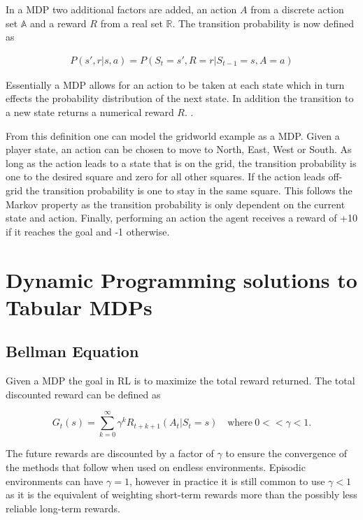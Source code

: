 In a MDP two additional factors are added, an action $A$ from a discrete action set $\mathbb{A}$ and a reward $R$ from a real set $\mathbb{R}$. The transition probability is now defined as

\begin{align}
    P(s',r|s,a) = P(S_{t}=s', R=r|S_{t-1}=s, A=a)
\end{align}

Essentially a MDP allows for an action to be taken at each state which in turn effects the probability distribution of the next state. In addition the transition to a new state returns a numerical reward $R$. \citep[p.~38]{sutton_barto_2018}. 

From this definition one can model the gridworld example as a MDP. Given a player state, an action can be chosen to move to North, East, West or South. As long as the action leads to a state that is on the grid, the transition probability is one to the desired square and zero for all other squares. If the action leads off-grid the transition probability is one to stay in the same square. This follows the Markov property as the transition probability is only dependent on the current state and action. Finally, performing an action the agent receives a reward of +10 if it reaches the goal and -1 otherwise.  

\section{Dynamic Programming solutions to Tabular MDPs}

\subsection{Bellman Equation}

Given a MDP the goal in RL is to maximize the total reward returned. The total discounted reward can be defined as

\begin{equation}
    \label{eq:return}
    G_t(s) = \sum_{k=0}^\infty \gamma^kR_{t+k+1}(A_t| S_t=s)\quad \text{where} ~ 0 << \gamma < 1.
\end{equation}

The future rewards are discounted by a factor of $\gamma$ to ensure the convergence of the methods that follow when used on endless environments. Episodic environments can have $\gamma=1$, however in practice it is still common to use $\gamma < 1$ as it is the equivalent of weighting short-term rewards more than the possibly less reliable long-term rewards.


